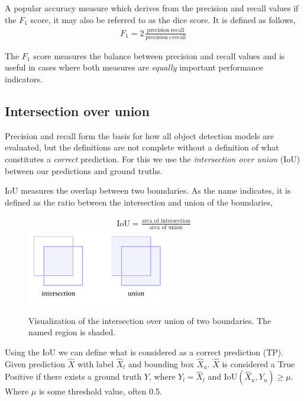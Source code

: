 A popular accuracy measure which derives from the precision and recall values if the \(F_1\) score, it may also be referred to as the dice score.
It is defined as follows,
%
\begin{align*}
  F_1=2\frac{\text{precision}\cdot\text{recall}}{\text{precision}+\text{recall}}
\end{align*}

The \(F_1\) score measures the balance between precision and recall values and is useful in cases where both measures are \textit{equally} important performance indicators.

\subsection{Intersection over union}
Precision and recall form the basis for how all object detection models are evaluated, but the definitions are not complete without a definition of what constitutes a \textit{correct} prediction.
For this we use the \textit{intersection over union} (IoU) between our predictions and ground truths.

IoU measures the overlap between two boundaries.
As the name indicates, it is defined as the ratio between the intersection and union of the boundaries,

\begin{figure}[htb]
  \centering
  \begin{gather*}
    \text{IoU}=\frac{\text{area of intersection}}{\text{area of union}}
  \end{gather*}
  \includegraphics[width=0.55\textwidth]{figs/background/iou.pdf}
\caption[Intersection over union]{Visualization of the intersection over union of two boundaries.
The named region is shaded.}\label{fig:iou}
\end{figure}

Using the IoU we can define what is considered as a correct prediction (TP).
Given prediction \(\hat{X}\) with label \(\hat{X}_l\) and bounding box \(\hat{X}_u\). \(\hat{X}\) is considered a True Positive if there exists a ground truth \(Y\), where \(Y_{l}=\hat{X}_l\) and \(\text{IoU}(\hat{X}_u, Y_{u})\ge \mu \).
Where \( \mu \) is some threshold value, often 0.5.


